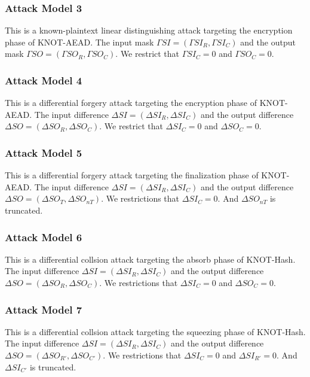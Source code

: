 \subsubsection{Attack Model 3}
This is a known-plaintext linear distinguishing attack targeting the encryption phase of KNOT-AEAD. The input mask $\Gamma SI=(\Gamma SI_R,\Gamma SI_C)$ and the output mask $\Gamma SO=(\Gamma SO_R,\Gamma SO_C)$. We restrict that $\Gamma SI_C=0$ and $\Gamma SO_C=0$. 


\subsubsection{Attack Model 4}
This is a differential forgery attack targeting the encryption phase of KNOT-AEAD. The input difference $\Delta SI=(\Delta SI_R,\Delta SI_C)$ and the output difference $\Delta SO=(\Delta SO_R,\Delta SO_C)$. We restrict that $\Delta SI_C=0$ and $\Delta SO_C=0$. 

\subsubsection{Attack Model 5}
This is a differential forgery attack targeting the finalization phase of KNOT-AEAD. The input difference $\Delta SI=(\Delta SI_R,\Delta SI_C)$ and the output difference $\Delta SO=(\Delta SO_T,\Delta SO_{nT})$. We restrictions that $\Delta SI_C=0$. And $\Delta SO_{nT}$ is truncated. 



\subsubsection{Attack Model 6}
This is a differential collsion attack targeting the absorb phase of KNOT-Hash. The input difference $\Delta SI=(\Delta SI_R,\Delta SI_C)$ and the output difference $\Delta SO=(\Delta SO_R,\Delta SO_C)$. We restrictions that $\Delta SI_C=0$ and $\Delta SO_C=0$. 

\subsubsection{Attack Model 7}
This is a differential collsion attack targeting the squeezing phase of KNOT-Hash. The input difference $\Delta SI=(\Delta SI_R,\Delta SI_C)$ and the output difference $\Delta SO=(\Delta SO_{R'},\Delta SO_{C'})$. We restrictions that $\Delta SI_C=0$ and $\Delta SI_{R'}=0$. And $\Delta SI_{C'}$ is truncated. 

